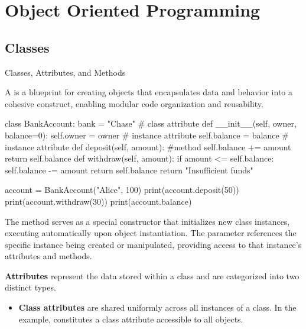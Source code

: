 \documentclass[10pt]{article}
\begin{document}
\section{Object Oriented Programming}

  \subsection{Classes}
    \label{sec:classes}

    \begin{core}{Classes, Attributes, and Methods}

      A  is a blueprint for creating objects that encapsulates data and behavior into a cohesive construct, enabling modular code organization and reusability.

      \begin{pyconsole}

        class BankAccount:
            bank = "Chase" # class attribute
            def __init__(self, owner, balance=0):
                self.owner = owner # instance attribute
                self.balance = balance # instance attribute
            def deposit(self, amount): #method
                self.balance += amount
                return self.balance
            def withdraw(self, amount):
                if amount <= self.balance:
                    self.balance -= amount
                    return self.balance
                return "Insufficient funds"
        
        account = BankAccount("Alice", 100)
        print(account.deposit(50))
        print(account.withdraw(30))
        print(account.balance)

      \end{pyconsole}
      
      The  method serves as a special constructor that initializes new class instances, executing automatically upon object instantiation. The  parameter references the specific instance being created or manipulated, providing access to that instance's attributes and methods.
      
      \textbf{Attributes} represent the data stored within a class and are categorized into two distinct types.

      \begin{itemize}

        \item \textbf{Class attributes} are shared uniformly across all instances of a class. In the  example,  constitutes a class attribute accessible to all  objects.


\end{itemize}
\end{core}
\end{document}
